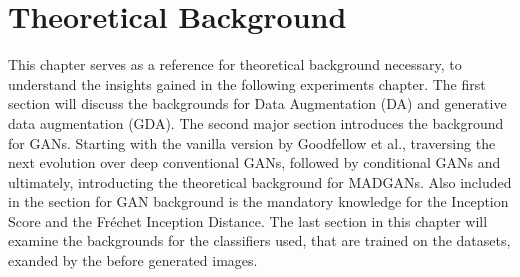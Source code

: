 \section{Theoretical Background}\label{body_theoretical_background}
This chapter serves as a reference for theoretical background necessary, to understand the insights gained in the following experiments chapter. The first section will discuss the backgrounds for Data Augmentation (DA) and generative data augmentation (GDA). The second major section introduces the background for GANs. Starting with the vanilla version by Goodfellow et al., traversing the next evolution over deep conventional GANs, followed by conditional GANs and ultimately, introducting the theoretical background for MADGANs. Also included in the section for GAN background is the mandatory knowledge for the Inception Score and the Fréchet Inception Distance. The last section in this chapter will examine the backgrounds for the classifiers used, that are trained on the datasets, exanded by the before generated images. 




\newpage
